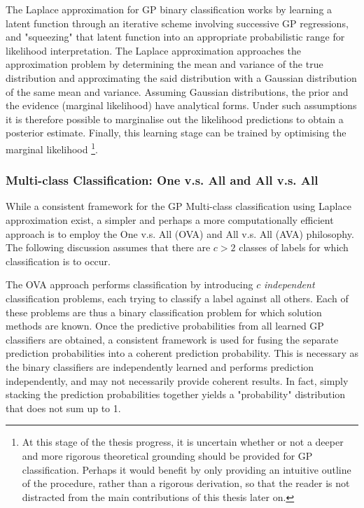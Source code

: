 				The Laplace approximation for GP binary classification works by learning a latent function through an iterative scheme involving successive GP regressions, and "squeezing" that latent function into an appropriate probabilistic range for likelihood interpretation. The Laplace approximation approaches the approximation problem by determining the mean and variance of the true distribution and approximating the said distribution with a Gaussian distribution of the same mean and variance. Assuming Gaussian distributions, the prior and the evidence (marginal likelihood) have analytical forms. Under such assumptions it is therefore possible to marginalise out the likelihood predictions to obtain a posterior estimate. Finally, this learning stage can be trained by optimising the marginal likelihood \footnote{{\color{BurntOrange} At this stage of the thesis progress, it is uncertain whether or not a deeper and more rigorous theoretical grounding should be provided for GP classification. Perhaps it would benefit by only providing an intuitive outline of the procedure, rather than a rigorous derivation, so that the reader is not distracted from the main contributions of this thesis later on.}}.
				
			\subsubsection{Multi-class Classification: One v.s. All and All v.s. All}
			
				While a consistent framework for the GP Multi-class classification using Laplace approximation exist, a simpler and perhaps a more computationally efficient approach is to employ the One v.s. All (OVA) and All v.s. All (AVA) philosophy. The following discussion assumes that there are $c > 2$ classes of labels for which classification is to occur. 
				
				The OVA approach performs classification by introducing $c$ \textit{independent} classification problems, each trying to classify a label against all others. Each of these problems are thus a binary classification problem for which solution methods are known. Once the predictive probabilities from all learned GP classifiers are obtained, a consistent framework is used for fusing the separate prediction probabilities into a coherent prediction probability. This is necessary as the binary classifiers are independently learned and performs prediction independently, and may not necessarily provide coherent results. In fact, simply stacking the prediction probabilities together yields a "probability" distribution that does not sum up to 1.
				
